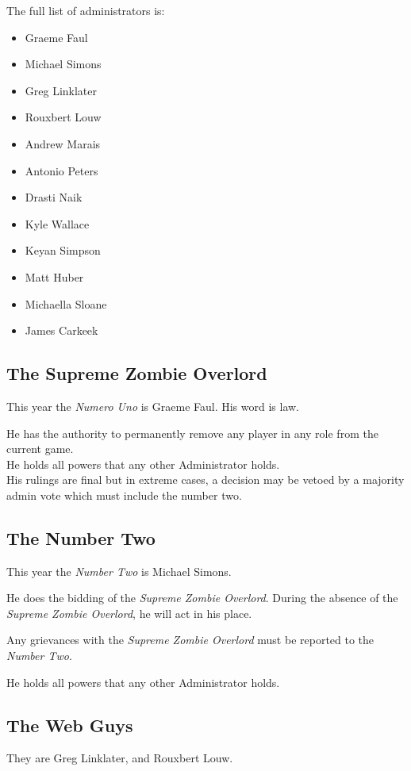 \documentclass[a4paper,12pt]{article}
\newcommand{\theMainGuy}{Graeme Faul}
\newcommand{\theWebDude}{Greg Linklater}
\newcommand{\theOtherWebdude}{Rouxbert Louw}
\begin{document}
The full list of administrators is:
\begin{itemize}
    \item {Graeme Faul}
    \item {Michael Simons}
    \item {Greg Linklater}
    \item {Rouxbert Louw}
    \item {Andrew Marais}
    \item {Antonio Peters}
    \item {Drasti Naik}
    \item {Kyle Wallace}
    \item {Keyan Simpson}
    \item {Matt Huber}
    \item {Michaella Sloane}
    \item {James Carkeek}    
    
\end{itemize}

\subsection{The Supreme Zombie Overlord}

This year the \emph{Numero Uno} is \theMainGuy.
His word is law.

He has the authority to permanently remove any player in any role from the current game.\\

He holds all powers that any other Administrator holds.\\

His rulings are final but in extreme cases, a decision may be vetoed by a majority admin vote which must include the number two.

\subsection{The Number Two}

This year the \emph{Number Two} is Michael Simons.

He does the bidding of the \emph{Supreme Zombie Overlord}. During the absence of the \emph{Supreme Zombie Overlord}, he will act in his place.

Any grievances with the \emph{Supreme Zombie Overlord} must be reported to the \emph{Number Two}.

He holds all powers that any other Administrator holds.

\subsection{The Web Guys}
They are \theWebDude, and \theOtherWebdude.
\end{document}

